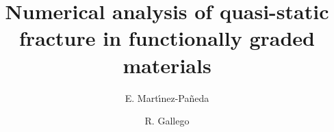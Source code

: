 %
%
%
%
%
%
\RequirePackage{fix-cm}
%
\documentclass[twocolumn,natbib]{svjour3}          %
%
\smartqed  %
%
\usepackage{graphicx}
\usepackage{epstopdf}
\usepackage{float}
\usepackage[caption=false]{subfig}
\usepackage{multirow}

%
%
%
%
\journalname{}
%
\sloppy

\title{Numerical analysis of quasi-static fracture in functionally graded materials}


\author{E. Mart\'{\i}nez-Pa\~neda         \and
        R. Gallego %
}


